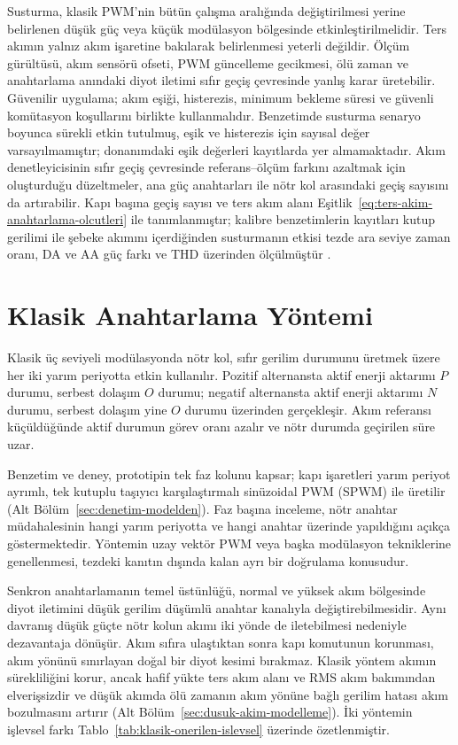 Susturma, klasik PWM'nin bütün çalışma aralığında değiştirilmesi yerine belirlenen düşük güç veya küçük modülasyon bölgesinde etkinleştirilmelidir. Ters akımın yalnız akım işaretine bakılarak belirlenmesi yeterli değildir. Ölçüm gürültüsü, akım sensörü ofseti, PWM güncelleme gecikmesi, ölü zaman ve anahtarlama anındaki diyot iletimi sıfır geçiş çevresinde yanlış karar üretebilir. Güvenilir uygulama; akım eşiği, histerezis, minimum bekleme süresi ve güvenli komütasyon koşullarını birlikte kullanmalıdır. Benzetimde susturma senaryo boyunca sürekli etkin tutulmuş, eşik ve histerezis için sayısal değer varsayılmamıştır; donanımdaki eşik değerleri kayıtlarda yer almamaktadır. Akım denetleyicisinin sıfır geçiş çevresinde referans--ölçüm farkını azaltmak için oluşturduğu düzeltmeler, ana güç anahtarları ile nötr kol arasındaki geçiş sayısını da artırabilir. Kapı başına geçiş sayısı ve ters akım alanı Eşitlik~\eqref{eq:ters-akim-anahtarlama-olcutleri} ile tanımlanmıştır; kalibre benzetimlerin kayıtları kutup gerilimi ile şebeke akımını içerdiğinden susturmanın etkisi tezde ara seviye zaman oranı, DA ve AA güç farkı ve THD üzerinden ölçülmüştür \citep{Teodorescu2006PR,Zhang2014Deadtime}.

\section{Klasik Anahtarlama Yöntemi}

Klasik üç seviyeli modülasyonda nötr kol, sıfır gerilim durumunu üretmek üzere her iki yarım periyotta etkin kullanılır. Pozitif alternansta aktif enerji aktarımı $P$ durumu, serbest dolaşım $O$ durumu; negatif alternansta aktif enerji aktarımı $N$ durumu, serbest dolaşım yine $O$ durumu üzerinden gerçekleşir. Akım referansı küçüldüğünde aktif durumun görev oranı azalır ve nötr durumda geçirilen süre uzar.

Benzetim ve deney, prototipin tek faz kolunu kapsar; kapı işaretleri yarım periyot ayrımlı, tek kutuplu taşıyıcı karşılaştırmalı sinüzoidal PWM (SPWM) ile üretilir (Alt Bölüm~\ref{sec:denetim-modelden}). Faz başına inceleme, nötr anahtar müdahalesinin hangi yarım periyotta ve hangi anahtar üzerinde yapıldığını açıkça göstermektedir. Yöntemin uzay vektör PWM veya başka modülasyon tekniklerine genellenmesi, tezdeki kanıtın dışında kalan ayrı bir doğrulama konusudur.

Senkron anahtarlamanın temel üstünlüğü, normal ve yüksek akım bölgesinde diyot iletimini düşük gerilim düşümlü anahtar kanalıyla değiştirebilmesidir. Aynı davranış düşük güçte nötr kolun akımı iki yönde de iletebilmesi nedeniyle dezavantaja dönüşür. Akım sıfıra ulaştıktan sonra kapı komutunun korunması, akım yönünü sınırlayan doğal bir diyot kesimi bırakmaz. Klasik yöntem akımın sürekliliğini korur, ancak hafif yükte ters akım alanı ve RMS akım bakımından elverişsizdir ve düşük akımda ölü zamanın akım yönüne bağlı gerilim hatası akım bozulmasını artırır (Alt Bölüm~\ref{sec:dusuk-akim-modelleme}). İki yöntemin işlevsel farkı Tablo~\ref{tab:klasik-onerilen-islevsel} üzerinde özetlenmiştir.

